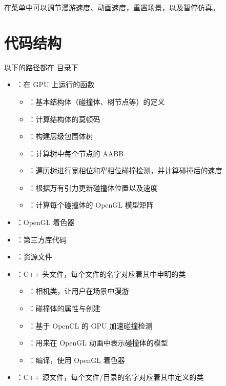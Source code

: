 在菜单中可以调节漫游速度、动画速度，重置场景，以及暂停仿真。

\section{代码结构}

以下的路径都在  目录下

\begin{itemize}
    \item {}：在 GPU 上运行的函数
    \begin{itemize}
        \item {}：基本结构体（碰撞体、树节点等）的定义
        \item {}：计算结构体的莫顿码
        \item {}：构建层级包围体树
        \item {}：计算树中每个节点的 AABB
        \item {}：遍历树进行宽相位和窄相位碰撞检测，并计算碰撞后的速度
        \item {}：根据万有引力更新碰撞体位置以及速度
        \item {}：计算每个碰撞体的 OpenGL 模型矩阵
    \end{itemize}
    \item {}：OpenGL 着色器
    \item {}：第三方库代码
    \item {}：资源文件
    \item {}：C++ 头文件，每个文件的名字对应着其中申明的类
    \begin{itemize}
        \item {}：相机类，让用户在场景中漫游
        \item {}：碰撞体的属性与创建
        \item {}：基于 OpenCL 的 GPU 加速碰撞检测
        \item {}：用来在 OpenGL 动画中表示碰撞体的模型
        \item {}：编译，使用 OpenGL 着色器
    \end{itemize}
    \item {}：C++ 源文件，每个文件/目录的名字对应着其中定义的类
\end{itemize}

